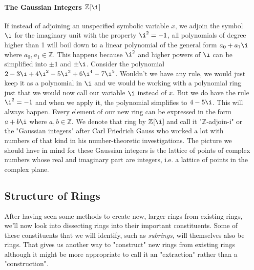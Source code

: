 



\paragraph{The Gaussian Integers $\mathbb{Z}[\i]$}
If instead of adjoining an unspecified symbolic variable $x$, we adjoin the symbol $\i$ for the imaginary unit with the property $\i^2 = -1$, all polynomials of degree higher than 1 will boil down to a linear polynomial of the general form $a_0 + a_1 \i$ where $a_0,a_1 \in \mathbb{Z}$. This happens because $\i^2$ and higher powers of $\i$ can be simplified into $\pm 1$ and $\pm \i$. Consider the polynomial $2 - 3 \i + 4 \i^2 - 5 \i^3 + 6 \i^4 - 7 \i^5$. Wouldn't we have any rule, we would just keep it as a polynomial in $\i$ and we would be working with a polynomial ring just that we would now call our variable $\i$ instead of $x$. But we do have the rule $\i^2 = -1$ and when we apply it, the polynomial simplifies to $4 - 5 \i$. This will always happen. Every element of our new ring can be expressed in the form $a + b \i$ where $a,b \in \mathbb{Z}$. We denote that ring by $\mathbb{Z}[\i]$ and call it "$\mathbb{Z}$-adjoin-i" or the "Gaussian integers" after Carl Friedrich Gauss who worked a lot with numbers of that kind in his number-theoretic investigations. The picture we should have in mind for these Gaussian integers is the lattice of points of complex numbers whose real and imaginary part are integers, i.e. a lattice of points in the complex plane.

\subsection{Structure of Rings}
After having seen some methods to create new, larger rings from existing rings, we'll now look into dissecting rings into their important constituents. Some of these constituents that we will identify, such as \emph{subrings}, will themselves also be rings. That gives us another way to "construct" new rings from existing rings although it might be more appropriate to call it an "extraction" rather than a "construction".

